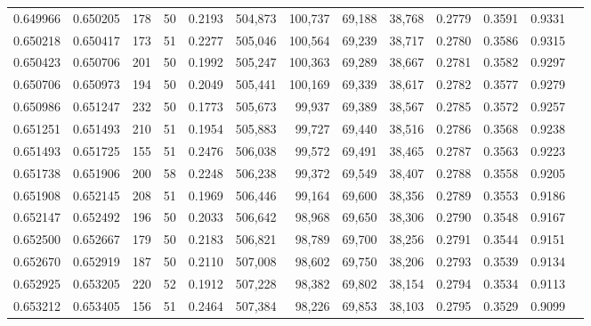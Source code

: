 \begin{tabular}{rrrrrrrrrrrrr}
0.649966 & 0.650205 &   178 &  50 &                                     0.2193 & 504,873 & 100,737 &  69,188 &  38,768 & 0.2779 & 0.3591 & 0.9331 \\
0.650218 & 0.650417 &   173 &  51 &                                     0.2277 & 505,046 & 100,564 &  69,239 &  38,717 & 0.2780 & 0.3586 & 0.9315 \\
0.650423 & 0.650706 &   201 &  50 &                                     0.1992 & 505,247 & 100,363 &  69,289 &  38,667 & 0.2781 & 0.3582 & 0.9297 \\
0.650706 & 0.650973 &   194 &  50 &                                     0.2049 & 505,441 & 100,169 &  69,339 &  38,617 & 0.2782 & 0.3577 & 0.9279 \\
0.650986 & 0.651247 &   232 &  50 &                                     0.1773 & 505,673 &  99,937 &  69,389 &  38,567 & 0.2785 & 0.3572 & 0.9257 \\
0.651251 & 0.651493 &   210 &  51 &                                     0.1954 & 505,883 &  99,727 &  69,440 &  38,516 & 0.2786 & 0.3568 & 0.9238 \\
0.651493 & 0.651725 &   155 &  51 &                                     0.2476 & 506,038 &  99,572 &  69,491 &  38,465 & 0.2787 & 0.3563 & 0.9223 \\
0.651738 & 0.651906 &   200 &  58 &                                     0.2248 & 506,238 &  99,372 &  69,549 &  38,407 & 0.2788 & 0.3558 & 0.9205 \\
0.651908 & 0.652145 &   208 &  51 &                                     0.1969 & 506,446 &  99,164 &  69,600 &  38,356 & 0.2789 & 0.3553 & 0.9186 \\
0.652147 & 0.652492 &   196 &  50 &                                     0.2033 & 506,642 &  98,968 &  69,650 &  38,306 & 0.2790 & 0.3548 & 0.9167 \\
0.652500 & 0.652667 &   179 &  50 &                                     0.2183 & 506,821 &  98,789 &  69,700 &  38,256 & 0.2791 & 0.3544 & 0.9151 \\
0.652670 & 0.652919 &   187 &  50 &                                     0.2110 & 507,008 &  98,602 &  69,750 &  38,206 & 0.2793 & 0.3539 & 0.9134 \\
0.652925 & 0.653205 &   220 &  52 &                                     0.1912 & 507,228 &  98,382 &  69,802 &  38,154 & 0.2794 & 0.3534 & 0.9113 \\
0.653212 & 0.653405 &   156 &  51 &                                     0.2464 & 507,384 &  98,226 &  69,853 &  38,103 & 0.2795 & 0.3529 & 0.9099 \\

\end{tabular}

